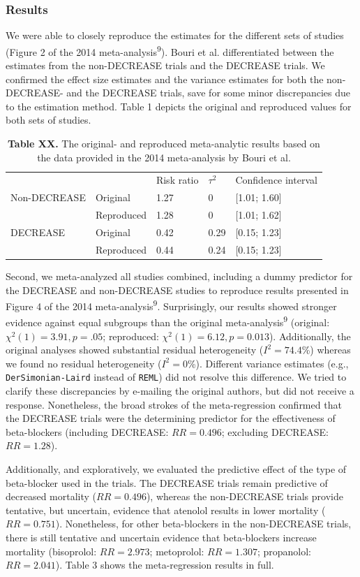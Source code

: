 \documentclass[]{article}
\begin{document}
\subsubsection{Results}\label{results}

We were able to closely reproduce the estimates for the different sets
of studies (Figure 2 of the 2014 meta-analysis\textsuperscript{9}).
Bouri et al. differentiated between the estimates from the non-DECREASE
trials and the DECREASE trials. We confirmed the effect size estimates
and the variance estimates for both the non-DECREASE- and the DECREASE
trials, save for some minor discrepancies due to the estimation method.
Table 1 depicts the original and reproduced values for both sets of
studies.

\begin{longtable}[]{@{}lllll@{}}
\caption{\textbf{Table XX.} The original- and reproduced meta-analytic
results based on the data provided in the 2014 meta-analysis by Bouri et
al.}\tabularnewline
\toprule
& & Risk ratio & \(\tau^2\) & Confidence interval\tabularnewline
Non-DECREASE & Original & 1.27 & 0 & {[}1.01; 1.60{]}\tabularnewline
& Reproduced & 1.28 & 0 & {[}1.01; 1.62{]}\tabularnewline
DECREASE & Original & 0.42 & 0.29 & {[}0.15; 1.23{]}\tabularnewline
& Reproduced & 0.44 & 0.24 & {[}0.15; 1.23{]}\tabularnewline
\bottomrule
\end{longtable}

Second, we meta-analyzed all studies combined, including a dummy
predictor for the DECREASE and non-DECREASE studies to reproduce results
presented in Figure 4 of the 2014 meta-analysis\textsuperscript{9}.
Surprisingly, our results showed stronger evidence against equal
subgroups than the original meta-analysis\textsuperscript{9} (original:
\(\chi^2(1)=3.91,p=.05\); reproduced: \(\chi^2(1)=6.12,p=0.013\)).
Additionally, the original analyses showed substantial residual
heterogeneity (\(I^2=74.4\)\%) whereas we found no residual
heterogeneity (\(I^2=0\)\%). Different variance estimates (e.g.,
\texttt{DerSimonian-Laird} instead of \texttt{REML}) did not resolve
this difference. We tried to clarify these discrepancies by e-mailing
the original authors, but did not receive a response. Nonetheless, the
broad strokes of the meta-regression confirmed that the DECREASE trials
were the determining predictor for the effectiveness of beta-blockers
(including DECREASE: \(RR=0.496\); excluding DECREASE: \(RR=1.28\)).

Additionally, and exploratively, we evaluated the predictive effect of
the type of beta-blocker used in the trials. The DECREASE trials remain
predictive of decreased mortality (\(RR=0.496\)), whereas the
non-DECREASE trials provide tentative, but uncertain, evidence that
atenolol results in lower mortality (\(RR=0.751\)). Nonetheless, for
other beta-blockers in the non-DECREASE trials, there is still tentative
and uncertain evidence that beta-blockers increase mortality
(bisoprolol: \(RR=2.973\); metoprolol: \(RR=1.307\); propanolol:
\(RR=2.041\)). Table 3 shows the meta-regression results in full.
\end{document}
